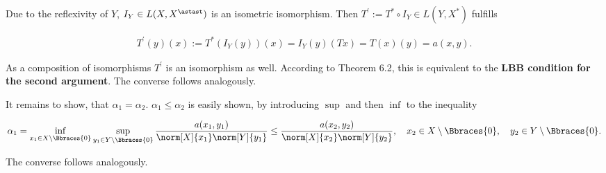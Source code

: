 \begin{solution}
\begin{enumerate}[label = \textbf{\alph*)}]
  Due to the reflexivity of $Y$, $I_Y \in L(X, X^\astast)$ is an isometric isomorphism.
  Then $T^\prime := T^\ast \circ I_Y \in L(Y, X^\ast)$ fulfills

  \begin{align*}
    T^\prime(y)(x) := T^\ast(I_Y(y))(x) = I_Y(y)(T x) = T(x)(y) = a(x, y).
  \end{align*}

  As a composition of isomorphisms $T^\prime$ is an isomorphism as well.
  According to Theorem 6.2, this is equivalent to the \textbf{LBB condition for the second argument}.
  The converse follows analogously.

  It remains to show, that $\alpha_1 = \alpha_2$.
  $\alpha_1 \leq \alpha_2$ is easily shown, by introducing $\sup$ and then $\inf$ to the inequality

  \begin{align*}
    \alpha_1
    =
    \inf_{x_1 \in X \setminus \Bbraces{0}}
      \sup_{y_1 \in Y \setminus \Bbraces{0}}
        \frac{a(x_1, y_1)}{\norm[X]{x_1} \norm[Y]{y_1}}
    \leq
    \frac{a(x_2, y_2)}{\norm[X]{x_2} \norm[Y]{y_2}},
    \quad
    x_2 \in X \setminus \Bbraces{0},
    \quad
    y_2 \in Y \setminus \Bbraces{0}.
  \end{align*}

  The converse follows analogously.

\end{enumerate}

\end{solution}

